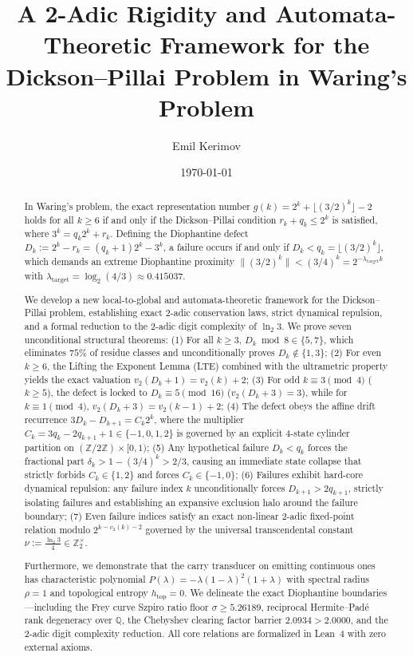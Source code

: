 \documentclass[11pt,reqno]{amsart}
\title[A 2-Adic and Automata Framework for the Dickson--Pillai Problem]{A 2-Adic Rigidity and Automata-Theoretic Framework for the Dickson--Pillai Problem in Waring's Problem}
\author{Emil Kerimov}
\date{\today}
\theoremstyle{definition}
\numberwithin{equation}{section}
\begin{document}
\begin{abstract}
In Waring's problem, the exact representation number $g(k) = 2^k + \lfloor(3/2)^k\rfloor - 2$ holds for all $k \ge 6$ if and only if the Dickson--Pillai condition $r_k + q_k \le 2^k$ is satisfied, where $3^k = q_k 2^k + r_k$. Defining the Diophantine defect $D_k := 2^k - r_k = (q_k + 1)2^k - 3^k$, a failure occurs if and only if $D_k < q_k = \lfloor(3/2)^k\rfloor$, which demands an extreme Diophantine proximity $\|(3/2)^k\| < (3/4)^k = 2^{-\lambda_{\mathrm{target}} k}$ with $\lambda_{\mathrm{target}} = \log_2(4/3) \approx 0.415037$.

We develop a new local-to-global and automata-theoretic framework for the Dickson--Pillai problem, establishing exact 2-adic conservation laws, strict dynamical repulsion, and a formal reduction to the 2-adic digit complexity of $\ln_2 3$. We prove seven unconditional structural theorems:
(1) For all $k \ge 3$, $D_k \bmod 8 \in \{5, 7\}$, which eliminates $75\%$ of residue classes and unconditionally proves $D_k \notin \{1, 3\}$;
(2) For even $k \ge 6$, the Lifting the Exponent Lemma (LTE) combined with the ultrametric property yields the exact valuation $v_2(D_k + 1) = v_2(k) + 2$;
(3) For odd $k \equiv 3 \pmod 4$ ($k \ge 5$), the defect is locked to $D_k \equiv 5 \pmod{16}$ ($v_2(D_k + 3) = 3$), while for $k \equiv 1 \pmod 4$, $v_2(D_k + 3) = v_2(k - 1) + 2$;
(4) The defect obeys the affine drift recurrence $3 D_k - D_{k+1} = C_k 2^k$, where the multiplier $C_k = 3 q_k - 2 q_{k+1} + 1 \in \{-1, 0, 1, 2\}$ is governed by an explicit 4-state cylinder partition on $(\mathbb{Z}/2\mathbb{Z}) \times [0, 1)$;
(5) Any hypothetical failure $D_k < q_k$ forces the fractional part $\delta_k > 1 - (3/4)^k > 2/3$, causing an immediate state collapse that strictly forbids $C_k \in \{1, 2\}$ and forces $C_k \in \{-1, 0\}$;
(6) Failures exhibit hard-core dynamical repulsion: any failure index $k$ unconditionally forces $D_{k+1} > 2 q_{k+1}$, strictly isolating failures and establishing an expansive exclusion halo around the failure boundary;
(7) Even failure indices satisfy an exact non-linear 2-adic fixed-point relation modulo $2^{k - v_2(k) - 2}$ governed by the universal transcendental constant $\nu := \frac{\ln_2 3}{4} \in \mathbb{Z}_2^\times$.

Furthermore, we demonstrate that the carry transducer on emitting continuous ones has characteristic polynomial $P(\lambda) = -\lambda(1-\lambda)^2(1+\lambda)$ with spectral radius $\rho = 1$ and topological entropy $h_{\mathrm{top}} = 0$. We delineate the exact Diophantine boundaries—including the Frey curve Szpiro ratio floor $\sigma \ge 5.26189$, reciprocal Hermite--Padé rank degeneracy over $\mathbb{Q}$, the Chebyshev clearing factor barrier $2.0934 > 2.0000$, and the 2-adic digit complexity reduction. All core relations are formalized in Lean~4 with zero external axioms.
\end{abstract}
\end{document}

